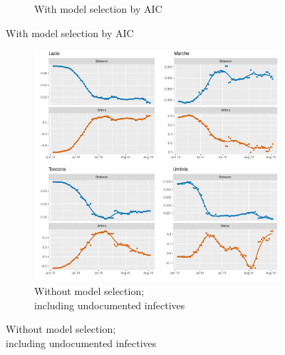 \documentclass[12pt]{article}
\begin{document}
\begin{appendices}
\begin{figure}[H]
\begin{subfigure}{\textwidth}
    	      \caption{With model selection by AIC}
    	      \label{fig:beta_between_over_time_centro_aic}
    	    \end{subfigure}
    	\end{figure}
        \begin{figure}[H]\ContinuedFloat
    	    \begin{subfigure}{\textwidth}
    	      \centering
    	      \includegraphics[width=\linewidth]{output/model_between_lag14_betas_Centro (IT)_UndocQuadratic_rolling.pdf}
    	      \caption{Without model selection; \\ including undocumented infectives}
    	      \label{fig:beta_between_over_time_centro_regular_undoc}
    	    \end{subfigure}
        \end{figure}
        \begin{figure}[H]\ContinuedFloat
    	    \begin{subfigure}{\textwidth}
    	      \centering

\end{subfigure}
\end{figure}
\end{appendices}
\end{document}
